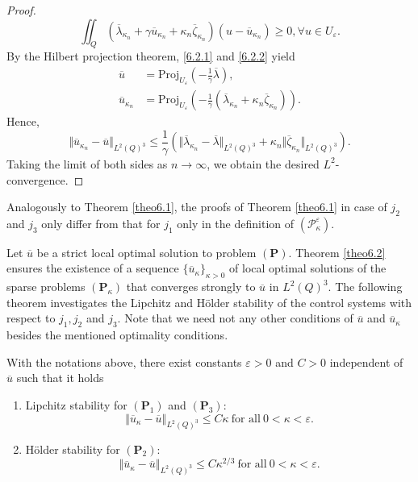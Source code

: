 \documentclass[reqno]{amsart}
\begin{document}
\begin{proof}
		\begin{equation} \label{6.2.2}
			\iint_Q(\overline{\lambda}_{\kappa_n} + \gamma \overline{u}_{\kappa_n} + \kappa_n \overline{\zeta}_{\kappa_n})(u-\overline{u}_{\kappa_n}) \geq 0, \forall u \in U_\varepsilon.
		\end{equation}
		By the Hilbert projection theorem, \eqref{6.2.1} and \eqref{6.2.2} yield
		\begin{align*}
			\overline{u}&= \text{Proj}_{U_\varepsilon}\left( - \frac{1}{\gamma}\overline{\lambda} \right), \\
			\overline{u}_{\kappa_n} &= \text{Proj}_{U_\varepsilon}\left( -\frac{1}{\gamma} (\overline{\lambda}_{\kappa_n} + \kappa_n \overline{\zeta}_{\kappa_n}) \right).
		\end{align*}
		Hence, 
		\[ \Vert \overline{u}_{\kappa_n} - \overline{u} \Vert_{L^2(Q)^3} \leq \frac{1}{\gamma} \left( \Vert \overline{\lambda}_{\kappa_n} - \overline{\lambda} \Vert_{L^2(Q)^3} + \kappa_n \Vert \overline{\zeta}_{\kappa_n} \Vert_{L^2(Q)^3} \right). \]
		Taking the limit of both sides as $n\rightarrow\infty$, we obtain the desired $L^2$-convergence.
	\end{proof}
	\begin{remark}
		\rm{Analogously to Theorem \ref{theo6.1}, the proofs of Theorem \ref{theo6.1} in case of $j_2$ and $j_3$ only differ from that for $j_1$ only in the definition of $(\mathcal{P}_\kappa^\varepsilon)$.}
	\end{remark}
	
	Let $\overline{u}$ be a strict local optimal solution to problem $(\textbf{P})$. Theorem \ref{theo6.2} ensures the existence of a sequence $\{ \overline{u}_\kappa \}_{\kappa>0}$ of local optimal solutions of the sparse problems $(\textbf{P}_\kappa)$ that converges strongly to $\overline{u}$ in $L^2(Q)^3$. The following theorem investigates the Lipchitz and H\"older stability of the control systems with respect to $j_1,j_2$ and $j_3$. Note that we need not any other conditions of $\overline{u}$ and $\overline{u}_\kappa$ besides the mentioned optimality conditions.
	
	\begin{theorem}\label{theo6.3}
		With the notations above, there exist constants $\varepsilon>0$ and $C>0$ independent of $\overline{u}$ such that it holds
		\begin{enumerate}
			\item Lipchitz stability for $(\textbf{P}_1)$ and $(\textbf{P}_3)$: 
			\begin{equation} \label{lipz_sta_j13}
				\left\Vert \overline{u}_\kappa - \overline{u} \right\Vert_{L^2(Q)^3} \leq C \kappa \ \text{for all} \ 0<\kappa <\varepsilon.
			\end{equation}
			\item H\"older stability for $(\textbf{P}_2)$: 
			\begin{equation} \label{lipz_sta_j2}
				\left\Vert \overline{u}_\kappa - \overline{u} \right\Vert_{L^2(Q)^3} \leq C \kappa^{2/3} \ \text{for all} \ 0<\kappa <\varepsilon.
			\end{equation}
		\end{enumerate}
	\end{theorem}
	
\end{document}
